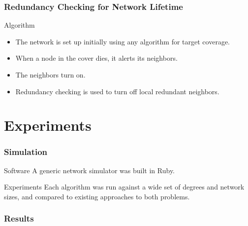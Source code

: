 \begin{frame}
  \frametitle{Redundancy Checking for Network Lifetime}
	\begin{block}{Algorithm}
	\begin{itemize}
	\item The network is set up initially using any algorithm for target coverage.
	\item When a node in the cover dies, it alerts its neighbors.
	\item The neighbors turn on.
	\item Redundancy checking is used to turn off local redundant neighbors.
	\end{itemize}
	\end{block}
\end{frame}

\section{Experiments}
\begin{frame}
\frametitle{Simulation}
	\begin{block}{Software}
	A generic network simulator was built in Ruby.
	\end{block}
	\begin{block}{Experiments}
	Each algorithm was run against a wide set of degrees and network sizes, and compared to existing approaches to both problems.
	\end{block}
\end{frame}
\begin{frame}[allowframebreaks]
	\frametitle{Results}
	\begin{tiny}
	
	
	
	\end{tiny}
\end{frame}

